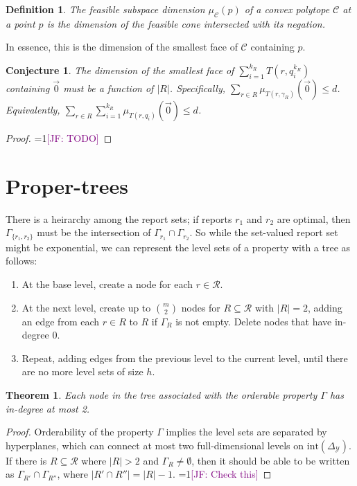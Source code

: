 \documentclass[12pt]{article}
\newcommand{\Comments}{1}
\newcommand{\mynote}[2]{\ifnum\Comments=1\textcolor{#1}{#2}\fi}
\newcommand{\jessie}[1]{\mynote{purple}{[JF: #1]}}
\newcommand{\simplex}{\Delta_\Y}
\newcommand{\C}{\mathcal{C}}
\newcommand{\R}{\mathcal{R}}
\newcommand{\Y}{\mathcal{Y}}
\newcommand{\inter}[1]{\mathrm{int}(#1)}%
\newtheorem{theorem}{Theorem}
\newtheorem{definition}{Definition}
\newtheorem{conjecture}{Conjecture}
\begin{document}
\begin{definition}
	The \emph{feasible subspace dimension} $\mu_\C(p)$ of a convex polytope $\C$ at a point $p$ is the dimension of the feasible cone intersected with its negation.
\end{definition}
In essence, this is the dimension of the smallest face of $\C$ containing $p$.

\begin{conjecture}
	The dimension of the smallest face of $\sum_{i=1}^{k_R}T(r, q_i^{k_R})$ containing $\vec 0$ must be a function of $|R|$.
	Specifically, $\sum_{r \in R}\mu_{T(r,\gamma_R)}(\vec 0) \leq d$.
	Equivalently, $\sum_{r \in R} \sum_{i=1}^{k_R} \mu_{T(r,q_i)}(\vec 0) \leq d$.
\end{conjecture}
\begin{proof}
	\jessie{TODO}
\end{proof}


\section{Proper-trees}
There is a heirarchy among the report sets; if reports $r_1$ and $r_2$ are optimal, then $\Gamma_{\{r_1, r_2\}}$ must be the intersection of $\Gamma_{r_1} \cap \Gamma_{r_2}$.
So while the set-valued report set might be exponential, we can represent the level sets of a property with a tree as follows:
\begin{enumerate}
	\item At the base level, create a node for each $r \in \R$.
	\item At the next level, create up to $\binom{m}{2}$ nodes for $R \subseteq \R$ with $|R| = 2$, adding an edge from each $r \in R$ to $R$ if $\Gamma_R$ is not empty. Delete nodes that have in-degree $0$.
	\item Repeat, adding edges from the previous level to the current level, until there are no more level sets of size $h$. 
\end{enumerate}

\begin{theorem}
	Each node in the tree associated with the orderable property $\Gamma$ has in-degree at most 2.
\end{theorem}
\begin{proof}
	Orderability of the property $\Gamma$ implies the level sets are separated by hyperplanes, which can connect at most two full-dimensional levels on $\inter{\simplex}$.
	If there is $R \subseteq \R$ where $|R| > 2$ and $\Gamma_R \neq \emptyset$, then it should be able to be written as $\Gamma_{R'} \cap \Gamma_{R''}$, where $|R' \cap R''| = |R| - 1$. \jessie{Check this}
\end{proof}
\end{document}
